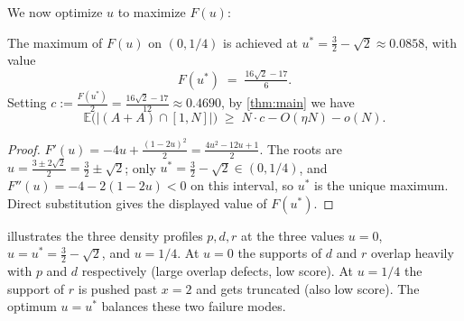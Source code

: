 \documentclass[11pt]{amsart}
\begin{document}
We now optimize $u$ to maximize $F(u)$:
\begin{corollary}\label{cor:optimize-u}
The maximum of $F(u)$ on $(0, 1/4)$ is achieved at $u^* = \tfrac{3}{2} - \sqrt{2} \approx 0.0858$, with value
\[
F(u^*) \;=\; \tfrac{16\sqrt 2-17}{6}.
\]
Setting $c := \tfrac{F(u^*)}{2} = \tfrac{16\sqrt 2-17}{12} \approx 0.4690$, by \cref{thm:main} we have
\begin{equation}\label{eq:eq-cor}
 \mathbb{E}\bigl(|(A + A) \cap [1, N]|\bigr) \;\geq\; N\cdot c - O(\eta N) - o(N).
\end{equation}
\end{corollary}
\begin{proof}
$F'(u) = -4u + \tfrac{(1-2u)^2}{2} = \tfrac{4u^2 - 12u + 1}{2}$. The roots are $u = \tfrac{3 \pm 2\sqrt 2}{2} = \tfrac{3}{2} \pm \sqrt 2$; only $u^* = \tfrac{3}{2} - \sqrt 2 \in (0, 1/4)$, and $F''(u) = -4 - 2(1-2u) < 0$ on this interval, so $u^*$ is the unique maximum. Direct substitution gives the displayed value of $F(u^*)$.
\end{proof}

 illustrates the three density profiles $p, d, r$ at the three values $u = 0$, $u = u^* = \tfrac{3}{2}-\sqrt 2$, and $u = 1/4$. At $u = 0$ the supports of $d$ and $r$ overlap heavily with $p$ and $d$ respectively (large overlap defects, low score). At $u = 1/4$ the support of $r$ is pushed past $x = 2$ and gets truncated (also low score). The optimum $u = u^*$ balances these two failure modes.
\end{document}

